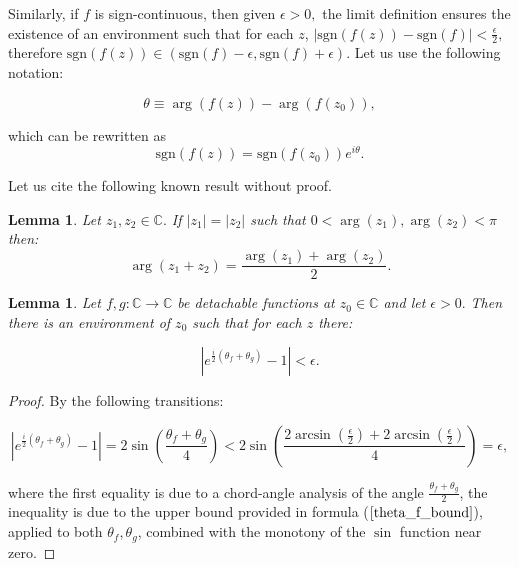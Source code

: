\documentclass[11pt]{book}
\newtheorem{lem}[thm]{Lemma}
\begin{document}
\begin{remark}Similarly, if $f$ is sign-continuous, then given $\epsilon>0,$ the limit definition ensures the existence of an environment such that for each $z$, $\left|\text{sgn}\left(f\left(z\right)\right)-\text{sgn}\left(f\right)\right|<\frac{\epsilon}{2},$ therefore $\text{sgn}\left(f\left(z\right)\right)\in\left(\text{sgn}\left(f\right)-\epsilon,\text{sgn}\left(f\right)+\epsilon\right).$ Let us use the following notation:

$$\theta\equiv\arg\left(f\left(z\right)\right)-\arg\left(f\left(z_{0}\right)\right),$$

which can be rewritten as $$\text{sgn}\left(f\left(z\right)\right)=\text{sgn}\left(f\left(z_{0}\right)\right)e^{i\theta}.\label{sgn_f_formula}$$

Let us cite the following known result without proof.
\end{remark}

\begin{lem}\label{argz1_z2}Let $z_{1},z_{2}\in\mathbb{C}.$ If $\left|z_{1}\right|=\left|z_{2}\right|$ such that $0<\arg\left(z_{1}\right),\arg\left(z_{2}\right)<\pi$ then: $$\arg\left(z_{1}+z_{2}\right)=\frac{\arg\left(z_{1}\right)+\arg\left(z_{2}\right)}{2}.\label{arg_sum}$$
\end{lem}

\begin{lem}\label{theta_fg_upper_bound}Let $f,g:\mathbb{C}\longrightarrow\mathbb{C}$ be detachable functions at $z_{0}\in\mathbb{C}$ and let $\epsilon>0.$ Then there is an environment of $z_{0}$ such that for each $z$ there:

$$\left|e^{\frac{i}{2}\left(\theta_{f}+\theta_{g}\right)}-1\right|<\epsilon.$$
\end{lem}
\begin{proof}By the following transitions:

$$\left|e^{\frac{i}{2}\left(\theta_{f}+\theta_{g}\right)}-1\right|=2\sin\left(\frac{\theta_{f}+\theta_{g}}{4}\right)<2\sin\left(\frac{2\arcsin\left(\frac{\epsilon}{2}\right)+2\arcsin\left(\frac{\epsilon}{2}\right)}{4}\right)=\epsilon,$$

where the first equality is due to a chord-angle analysis of the angle $\frac{\theta_{f}+\theta_{g}}{2}$, the inequality is due to the upper bound provided in formula ($\ref{theta_f_bound}$),
applied to both $\theta_{f},\theta_{g}$, combined with the monotony of the $\sin$ function near zero.
\end{proof}
\end{document}
